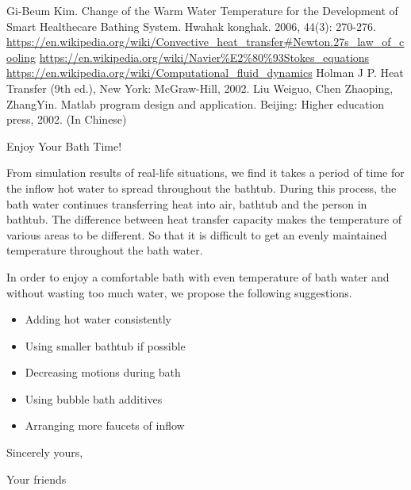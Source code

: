 \documentclass{mcmthesis}
\begin{document}
\begin{thebibliography}{99}

 Gi-Beum Kim. Change of the Warm Water Temperature for the Development of Smart Healthecare Bathing System. Hwahak konghak. 2006, 44(3): 270-276.
 \url{https://en.wikipedia.org/wiki/Convective_heat_transfer#Newton.27s_law_of_cooling}
 \url{https://en.wikipedia.org/wiki/Navier\%E2\%80\%93Stokes_equations}
 \url{https://en.wikipedia.org/wiki/Computational_fluid_dynamics}
 Holman J P. Heat Transfer (9th ed.), New York: McGraw-Hill, 2002. 
 Liu Weiguo, Chen Zhaoping, ZhangYin. Matlab program design and application. Beijing: Higher education press, 2002. (In Chinese)

\end{thebibliography}

\newpage

\begin{letter}{Enjoy Your Bath Time!}

From simulation results of real-life situations, we find it takes a period of time for the inflow hot water to spread throughout the bathtub. During this process, the bath water continues transferring heat into air, bathtub and the person in bathtub. The difference between heat transfer capacity makes the temperature of various areas to be different. So that it is difficult to get an evenly maintained temperature throughout the bath water.

In order to enjoy a comfortable bath with even temperature of bath water and without wasting too much water, we propose the following suggestions.

\begin{itemize}
\item Adding hot water consistently
\item Using smaller bathtub if possible
\item Decreasing motions during bath
\item Using bubble bath additives
\item Arranging more faucets of inflow
\end{itemize}

\vspace{\parskip}

Sincerely yours,

Your friends

\end{letter}
\end{document}
